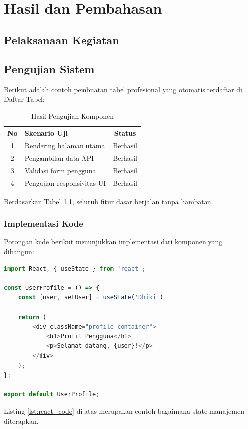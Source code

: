 \chapter{Hasil dan Pembahasan}

\section{Pelaksanaan Kegiatan}
\lipsum[7]

\section{Pengujian Sistem}
Berikut adalah contoh pembuatan tabel profesional yang otomatis terdaftar di Daftar Tabel:

\begin{table}[htbp]
    \centering
    \caption{Hasil Pengujian Komponen}
    \label{tab:hasil_uji}
    \begin{tabular}{clc}
        \toprule
        \textbf{No} & \textbf{Skenario Uji} & \textbf{Status} \\
        \midrule
        1 & Rendering halaman utama & Berhasil \\
        2 & Pengambilan data API & Berhasil \\
        3 & Validasi form pengguna & Berhasil \\
        4 & Pengujian responsivitas UI & Berhasil \\
        \bottomrule
    \end{tabular}
\end{table}

Berdasarkan Tabel \ref{tab:hasil_uji}, seluruh fitur dasar berjalan tanpa hambatan.

\subsection{Implementasi Kode}
Potongan kode berikut menunjukkan implementasi dari komponen yang dibangun:

\begin{lstlisting}[language=JavaScript, caption={Komponen React Sederhana}, label={lst:react_code}]
import React, { useState } from 'react';

const UserProfile = () => {
    const [user, setUser] = useState('Dhiki');

    return (
        <div className="profile-container">
            <h1>Profil Pengguna</h1>
            <p>Selamat datang, {user}!</p>
        </div>
    );
};

export default UserProfile;
\end{lstlisting}

Listing \ref{lst:react_code} di atas merupakan contoh bagaimana state manajemen diterapkan.